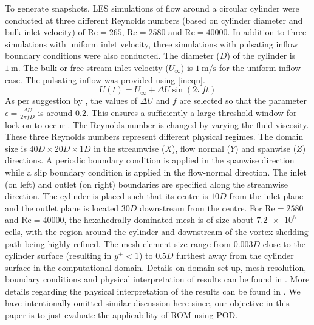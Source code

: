 \documentclass[3p,times,procedia]{elsarticle}
\begin{document}
To generate snapshots, LES simulations of flow around a circular cylinder were
conducted at three different Reynolds numbers (based on cylinder diameter and
bulk inlet velocity) of $\text{Re}=265$, $\text{Re}=2580$ and $\text{Re}=40000$.
In addition to three simulations with uniform inlet velocity, three simulations
with pulsating inflow boundary conditions were also conducted. The diameter
($D$) of the cylinder is $\SI{1}{\meter}$. The bulk or free-stream inlet
velocity ($U_{\infty}$) is $\SI{1}{\meter/\second}$ for the uniform inflow case.
The pulsating inflow was provided using \eqref{ineqn}.
\begin{equation}\label{ineqn}
U(t) = U_{\infty} + \Delta U\sin(2\pi f t)
\end{equation}
As per suggestion by \cite{Barbi1986vsl}, the values of $\Delta U$ and $f$ are
selected so that the parameter $\epsilon=\frac{\Delta U}{2\pi f D}$ is around
$0.2$. This ensures a sufficiently a large threshold window for lock-on to occur
\cite{Tabib2017auh}. The Reynolds number is changed by varying the fluid
viscosity. These three Reynolds numbers represent different physical regimes.
The domain size is $40D\times 20D \times 1D$ in the streamwise ($X$), flow
normal ($Y$) and spanwise ($Z$) directions. A periodic boundary condition is
applied in the spanwise direction while a slip boundary condition is applied in
the flow-normal direction. The inlet (on left) and outlet (on right) boundaries
are specified along the streamwise direction. The cylinder is placed such that
its centre is $10D$ from the inlet plane and the outlet plane is located $30D$
downstream from the centre. For $\text{Re}=2580$ and $\text{Re}=40000$, the
hexahedrally dominated mesh is of size about $\SI{7.2e6}{}$ cells, with the
region around the cylinder and downstream of the vortex shedding path being
highly refined. The mesh element size range from $0.003D$ close to the cylinder
surface (resulting in $y^{+}<1$) to $0.5D$ furthest away from the cylinder
surface in the computational domain. Details on domain set up, mesh resolution,
boundary conditions and physical interpretation of results can be found in
\cite{Tabib2017auh}. More details regarding the physical interpretation of the
results can be found in \cite{Barbi1986vsl,Liang2007les}. We have intentionally
omitted similar discussion here since, our objective in this paper is to just
evaluate the applicability of ROM using POD.
\end{document}
